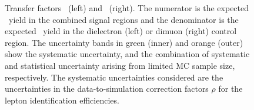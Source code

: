 \begin{figure}[htbp]
  \centering
  \caption{
    Transfer factors \RZee\ (left) and \RZmm\ (right).
    The numerator is the expected \zinvg\ yield in the combined signal regions and the denominator is the expected \zllg\ yield in the dielectron (left) or dimuon (right) control region.
    The uncertainty bands in green (inner) and orange (outer) show the systematic uncertainty, and the combination of systematic and statistical uncertainty arising from limited MC sample size, respectively. 
    The systematic uncertainties considered are the uncertainties in the data-to-simulation correction factors $\rho$ for the lepton identification efficiencies.
    }
  \label{fig:tf_z}
\end{figure}

